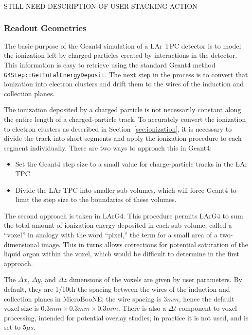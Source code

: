 \documentclass[12pt]{elsarticle}
\begin{document}
STILL NEED DESCRIPTION OF USER STACKING ACTION

\subsubsection{Readout Geometries}

The basic purpose of the Geant4 simulation of a LAr TPC detector is to
model the ionization left by charged particles created by interactions
in the detector. This information is easy to retrieve using the
standard Geant4 method {\tt G4Step::GetTotalEnergyDeposit}. The next
step in the process is to convert that ionization into electron
clusters and drift them to the wires of the induction and collection
planes. 

The ionization deposited by a charged particle is not necessarily
constant along the entire length of a charged-particle track. To
accurately convert the ionization to electron clusters as described in
Section~\ref{sec:ionization}, it is necessary to divide the track into
short segments and apply the ionization procedure to each segment
individually. There are two ways to approach this in Geant4:

\begin{itemize}
\item Set the Geant4 step size to a small value for charge-particle tracks in the LAr TPC.
\item Divide the LAr TPC into smaller sub-volumes, which will force Geant4 to limit the step size to the boundaries of these volumes.
\end{itemize}

The second approach is taken in LArG4. This procedure permits LArG4 to
sum the total amount of ionization energy deposited in each
sub-volume, called a ``voxel'' in analogy with the word ``pixel,'' the
term for a small area of a two-dimensional image. This in turns allows
corrections for potential saturation of the liquid argon within the
voxel, which would be difficult to determine in the first approach.

The ${\Delta}x$, ${\Delta}y$, and ${\Delta}z$ dimensions of the voxels
are given by user parameters. By default, they are 1/10th the spacing
between the wires of the induction and collection planes in
MicroBooNE; the wire spacing is 3$mm$, hence the default voxel size is
$0.3mm\times0.3mm\times0.3mm$. There is also a ${\Delta}t$-component
to voxel processing, intended for potential overlay studies; in
practice it is not used, and is set to 5${\mu}s$.
\end{document}
